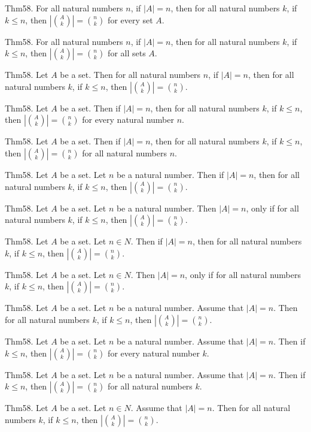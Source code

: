 \documentclass{article}
\begin{document}
Thm58. For all natural numbers $n$, if $| A | = n$, then for all natural numbers $k$, if $k \leq n$, then $| \binom{ A }{ k}| = \binom{ n }{ k}$ for every set $A$.

Thm58. For all natural numbers $n$, if $| A | = n$, then for all natural numbers $k$, if $k \leq n$, then $| \binom{ A }{ k}| = \binom{ n }{ k}$ for all sets $A$.

Thm58. Let $A$ be a set. Then for all natural numbers $n$, if $| A | = n$, then for all natural numbers $k$, if $k \leq n$, then $| \binom{ A }{ k}| = \binom{ n }{ k}$.

Thm58. Let $A$ be a set. Then if $| A | = n$, then for all natural numbers $k$, if $k \leq n$, then $| \binom{ A }{ k}| = \binom{ n }{ k}$ for every natural number $n$.

Thm58. Let $A$ be a set. Then if $| A | = n$, then for all natural numbers $k$, if $k \leq n$, then $| \binom{ A }{ k}| = \binom{ n }{ k}$ for all natural numbers $n$.

Thm58. Let $A$ be a set. Let $n$ be a natural number. Then if $| A | = n$, then for all natural numbers $k$, if $k \leq n$, then $| \binom{ A }{ k}| = \binom{ n }{ k}$.

Thm58. Let $A$ be a set. Let $n$ be a natural number. Then $| A | = n$, only if for all natural numbers $k$, if $k \leq n$, then $| \binom{ A }{ k}| = \binom{ n }{ k}$.

Thm58. Let $A$ be a set. Let $n \in N$. Then if $| A | = n$, then for all natural numbers $k$, if $k \leq n$, then $| \binom{ A }{ k}| = \binom{ n }{ k}$.

Thm58. Let $A$ be a set. Let $n \in N$. Then $| A | = n$, only if for all natural numbers $k$, if $k \leq n$, then $| \binom{ A }{ k}| = \binom{ n }{ k}$.

Thm58. Let $A$ be a set. Let $n$ be a natural number. Assume that $| A | = n$. Then for all natural numbers $k$, if $k \leq n$, then $| \binom{ A }{ k}| = \binom{ n }{ k}$.

Thm58. Let $A$ be a set. Let $n$ be a natural number. Assume that $| A | = n$. Then if $k \leq n$, then $| \binom{ A }{ k}| = \binom{ n }{ k}$ for every natural number $k$.

Thm58. Let $A$ be a set. Let $n$ be a natural number. Assume that $| A | = n$. Then if $k \leq n$, then $| \binom{ A }{ k}| = \binom{ n }{ k}$ for all natural numbers $k$.

Thm58. Let $A$ be a set. Let $n \in N$. Assume that $| A | = n$. Then for all natural numbers $k$, if $k \leq n$, then $| \binom{ A }{ k}| = \binom{ n }{ k}$.
\end{document}
